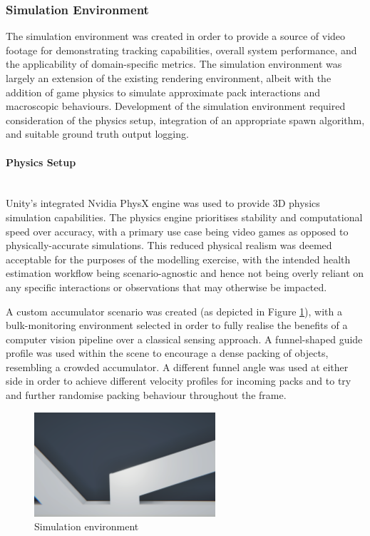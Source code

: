 \documentclass[10pt]{article}
\newcommand{\subsubsubsection}[1]{\paragraph{#1}\mbox{}\\}
\begin{document}
\clearpage

\subsubsection{Simulation Environment}
The simulation environment was created in order to provide a source of video footage for demonstrating tracking capabilities, overall system performance, and the applicability of domain-specific metrics. The simulation environment was largely an extension of the existing rendering environment, albeit with the addition of game physics to simulate approximate pack interactions and macroscopic behaviours. Development of the simulation environment required consideration of the physics setup, integration of an appropriate spawn algorithm, and suitable ground truth output logging.

\subsubsubsection{Physics Setup}
Unity's integrated Nvidia PhysX engine \cite{physx} was used to provide 3D physics simulation capabilities. The physics engine prioritises stability and computational speed over accuracy, with a primary use case being video games as opposed to physically-accurate simulations. This reduced physical realism was deemed acceptable for the purposes of the modelling exercise, with the intended health estimation workflow being scenario-agnostic and hence not being overly reliant on any specific interactions or observations that may otherwise be impacted.

A custom accumulator scenario was created (as depicted in Figure \ref{fig:simulation_scene}), with a bulk-monitoring environment selected in order to fully realise the benefits of a computer vision pipeline over a classical sensing approach. A funnel-shaped guide profile was used within the scene to encourage a dense packing of objects, resembling a crowded accumulator. A different funnel angle was used at either side in order to achieve different velocity profiles for incoming packs and to try and further randomise packing behaviour throughout the frame.

\vspace{0.1cm}
\begin{figure}[hbt]
\centering
\includegraphics[width=0.6\textwidth]{images/Physics_Setup.png}
\caption{Simulation environment}
\label{fig:simulation_scene}
\end{figure}
\end{document}
